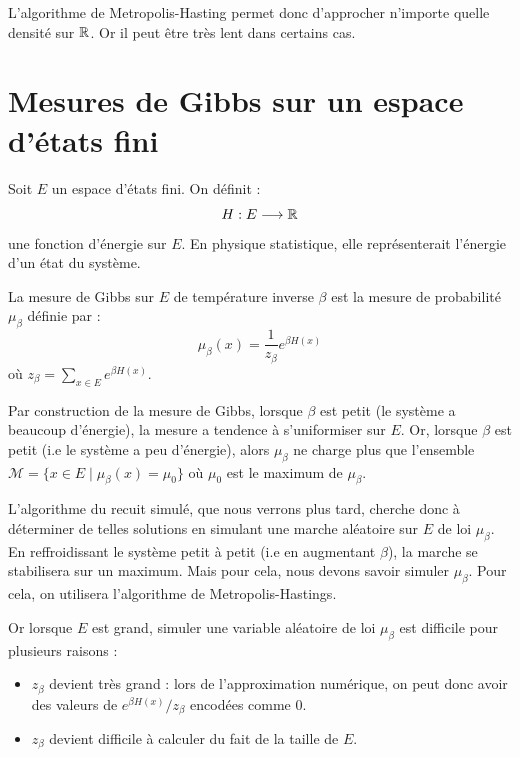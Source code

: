 L'algorithme de Metropolis-Hasting permet donc d'approcher n'importe quelle densité sur $\mathbb{R}$. 
Or il peut être très lent dans certains cas. 


\section{Mesures de Gibbs sur un espace d'états fini}

Soit $E$ un espace d'états fini. On définit : 
    \begin{equation}
        H : E \longrightarrow \mathbb{R}
    \end{equation}
une fonction d'énergie sur $E$. En physique statistique, elle représenterait 
l'énergie d'un état du système. 

\begin{definition}
    La mesure de Gibbs sur $E$ de température inverse $ \beta$ est la mesure 
    de probabilité $ \mu_{ \beta}$ définie par : 
        \begin{equation}
            \mu_\beta(x) = \frac{1}{z_\beta} e^{ \beta H(x) } 
        \end{equation}
    où $z_\beta = \sum_{x \in E} e^{ \beta H(x)}$. 
\end{definition}

\begin{proposition}[Fondamentale]
    Par construction de la mesure de Gibbs, lorsque $\beta$ est petit (le système a beaucoup d'énergie),
    la mesure a tendence à s'uniformiser sur $E$. Or, lorsque $ \beta$ est petit (i.e le système a peu d'énergie), 
    alors $ \mu_\beta$ ne charge plus que l'ensemble $ \mathcal{M} = \{x \in E \mid \mu_\beta(x) = \mu_0\}$ où 
    $ \mu_0$ est le maximum de $ \mu_\beta$. 

    \medskip 

    L'algorithme du recuit simulé, que nous verrons plus tard, cherche donc à déterminer de telles solutions en 
    simulant une marche aléatoire sur $E$ de loi $ \mu_\beta$. En reffroidissant le système petit à petit (i.e en augmentant 
    $ \beta$), la marche se stabilisera sur un maximum. Mais pour cela, nous devons savoir simuler $ \mu_\beta$. 
    Pour cela, on utilisera l'algorithme de Metropolis-Hastings.
\end{proposition}

Or lorsque $E$ est grand, simuler une variable aléatoire de loi $ \mu_\beta$ 
est difficile pour plusieurs raisons : 
\begin{itemize}
    \item $z_\beta$ devient très grand : lors de l'approximation numérique, 
    on peut donc avoir des valeurs de $ e^{ \beta H(x)}/z_\beta$ encodées
    comme $0$. 
    \item $z_\beta$ devient difficile à calculer du fait de la taille de $E$.
\end{itemize}

